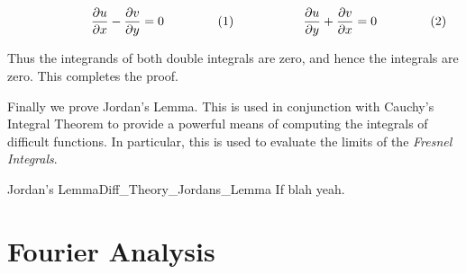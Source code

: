 \documentclass[crop=false,class=book,oneside]{standalone}
\begin{document}
\begin{bproof}
                \begin{subequations}
                    \begin{minipage}{0.49\textwidth}
                        \begin{equation}
                            \frac{\partial{u}}{\partial{x}}-
                            \frac{\partial{v}}{\partial{y}}=0
                        \end{equation}
                    \end{minipage}
                    \hfill
                    \begin{minipage}{0.49\textwidth}
                        \begin{equation}
                            \frac{\partial{u}}{\partial{y}}+
                            \frac{\partial{v}}{\partial{x}}=0
                        \end{equation}
                    \end{minipage}
                \end{subequations}
                \par\hfill\par
                Thus the integrands of both double integrals are zero,
                and hence the integrals are zero. This completes the proof.
            \end{bproof}
            Finally we prove Jordan's Lemma. This is used in conjunction
            with Cauchy's Integral Theorem to provide a powerful means of
            computing the integrals of difficult functions. In particular, this
            is used to evaluate the limits of the \textit{Fresnel Integrals}.
            \begin{ftheorem}{Jordan's Lemma}{Diff_Theory_Jordans_Lemma}
                If blah yeah.
            \end{ftheorem}
    \section{Fourier Analysis}
\end{document}
